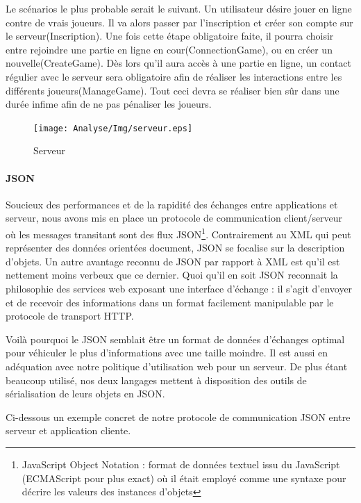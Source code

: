 		
		Le scénarios le plus probable serait le suivant. Un utilisateur désire jouer
		en ligne contre de vrais joueurs. 
		Il va alors passer par l'inscription et créer son compte sur le
		serveur(Inscription). Une fois cette étape obligatoire faite, il pourra
		choisir entre rejoindre une partie en ligne en cour(ConnectionGame), ou en
		créer un nouvelle(CreateGame). Dès lors qu'il aura accès à une partie en
		ligne, un contact régulier avec le serveur sera obligatoire afin de réaliser
		les interactions entre les différents joueurs(ManageGame). Tout ceci devra se
		réaliser bien sûr dans une durée infime afin de ne pas pénaliser les joueurs.	
		
		\begin{figure}
			\texttt{[image: Analyse/Img/serveur.eps]}
			 \caption {Serveur}
		\end{figure}
		
		\newpage
		
		
	\paragraph{JSON\\}	
		Soucieux des performances et de la rapidité des échanges entre applications et
		serveur, nous avons mis en place un protocole de communication client/serveur
		où les messages transitant sont des flux JSON\footnote{JavaScript Object
		Notation :  format de données textuel issu du JavaScript (ECMAScript pour plus
		exact) où il était employé comme une syntaxe pour décrire les valeurs des
		instances d’objets}. 	
		Contrairement au XML qui peut représenter des données orientées document,
		JSON se focalise sur la description d’objets.
		Un autre avantage reconnu de JSON par rapport à XML est qu’il est nettement
		moins verbeux que ce dernier.
		Quoi qu’il en soit JSON reconnait la philosophie des services web exposant
		une interface d’échange : il s’agit
		d’envoyer et de recevoir des informations dans un format facilement manipulable par
		le protocole de transport HTTP.
		
		
		Voilà pourquoi le JSON semblait être un format de données d'échanges optimal
		pour véhiculer le plus d'informations avec une taille moindre. Il est aussi en
		adéquation avec notre politique d'utilisation web pour un serveur.
		De plus étant beaucoup utilisé, nos deux
		langages mettent à disposition des outils de sérialisation de leurs objets en JSON.
		
		Ci-dessous un exemple concret de notre protocole de communication JSON entre
		serveur et application cliente.
		
